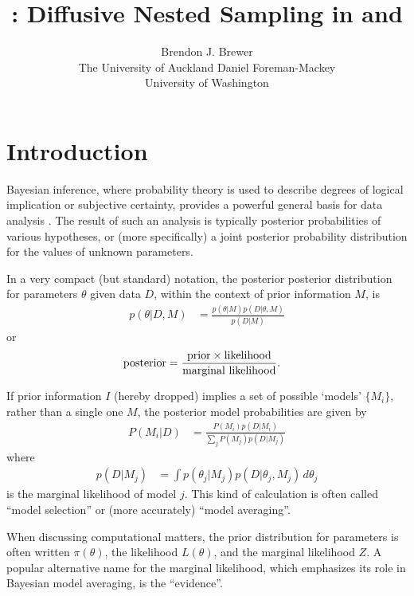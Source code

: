 \documentclass[article]{jss}
\author{Brendon J. Brewer\\The University of Auckland\And 
        Daniel Foreman-Mackey\\University of Washington}
\title{\pkg{DNest4}: Diffusive Nested Sampling in
\proglang{C++} and \proglang{Python}}
\newcommand{\params}{\theta}
\newcommand{\data}{D}
\begin{document}
\maketitle


\section{Introduction}
Bayesian inference, where probability theory is used to describe degrees of
logical implication or subjective certainty, provides a powerful general basis
for data analysis \citep{ohagan, sivia}. The result of such
an analysis is typically
posterior probabilities of various hypotheses, or (more specifically)
a joint posterior probability distribution for the values of unknown
parameters.

In a very compact (but standard) notation, the posterior
posterior distribution for parameters $\params$ given data $\data$, within
the context of prior information $M$, is
\begin{align}
p(\params | \data, M) &=
\frac{p(\params | M)p(\data | \params, M)}{p(\data | M)}
\end{align}
or
\begin{align}
\textnormal{posterior} &=
\frac{\textnormal{prior} \times \textnormal{likelihood}}
     {\textnormal{marginal likelihood}}.
\end{align}

If prior information $I$ (hereby dropped)
implies a set of possible `models' $\{M_i\}$,
rather than a single one $M$, the posterior model probabilities are given by
\begin{align}
P(M_i | \data) &=
\frac{P(M_i)p(\data | M_i)}{\sum_j P(M_j)p(\data | M_j)}
\end{align}
where
\begin{align}
p(\data | M_j) &= \int p(\theta_j | M_j)p(\data | \theta_j, M_j) \, d\theta_j
\end{align}
is the marginal likelihood of model $j$. This kind of calculation is often
called ``model selection'' or (more accurately) ``model averaging''.

When discussing computational matters, the prior distribution for parameters
is
often written $\pi(\theta)$, the likelihood $L(\theta)$,
and the marginal likelihood $Z$. A popular alternative name for the marginal
likelihood, which emphasizes its role in Bayesian model averaging,
is the ``evidence''.
\end{document}
